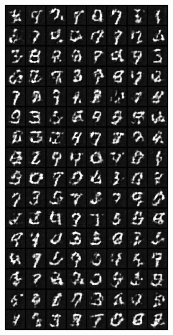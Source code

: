 \begin{figure}[H]
    \centering

    \begin{subfigure}{0.2\textwidth}
        \centering
        \includegraphics[width=0.95\linewidth]{GAN/fake_sample_epoch_0001.png}
        \caption{}
        \label{subfig:GAN/fake_sample_epoch_0001}
    \end{subfigure}%

\end{figure}
